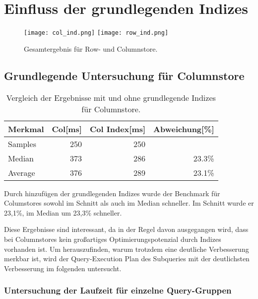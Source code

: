 \section{Einfluss der grundlegenden Indizes}\label{auswertung:basic_indizes}
\begin{figure}[H]
    \centering
    \texttt{[image: col\_ind.png]}
    \texttt{[image: row\_ind.png]}
    \caption{Gesamtergebnis für Row- und Columnstore.}
	\label{fig:ind_overall}
\end{figure}

\subsection{Grundlegende Untersuchung für Columnstore}
\begin{table}[H]
\centering
    \begin{tabularx}{\textwidth}{lrrr}
        \toprule
        Merkmal             &   Col[ms]    &    Col Index[ms] & Abweichung[\%]\\
        \toprule
        Samples             &   250        &   250      &        \\
        \midrule    
        Median              &   373        &   286      & 23.3\%\\
        Average             &   376        &   289      & 23.1\%\\
        \bottomrule
    \end{tabularx}
\caption{Vergleich der Ergebnisse mit und ohne grundlegende Indizes für Columnstore.}
\label{tab:basic_index_col}
\end{table}

Durch hinzufügen der grundlegenden Indizes wurde der Benchmark
für Columstores sowohl im Schnitt als auch im Median schneller.
Im Schnitt wurde er 23,1\%, im Median um 23,3\% schneller.

Diese Ergebnisse sind interessant, da in der Regel davon ausgegangen wird, 
dass bei Columnstores kein großartiges Optimierungspotenzial durch Indizes vorhanden ist.
Um herauszufinden, warum trotzdem eine deutliche Verbesserung merkbar ist,
wird der Query-Execution Plan des Subqueries mit der deutlichsten Verbesserung
im folgenden untersucht.

\subsubsection{Untersuchung der Laufzeit für einzelne Query-Gruppen}

